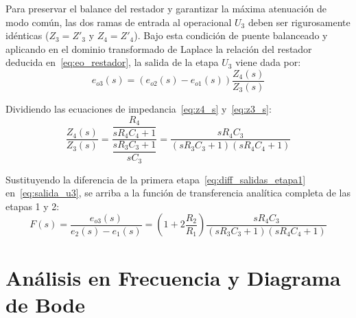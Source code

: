 Para preservar el balance del restador y garantizar la máxima atenuación de modo común, las dos ramas de entrada al
operacional $U_3$ deben ser rigurosamente idénticas ($Z_3 = Z'_3$ y $Z_4 = Z'_4$). Bajo esta condición de puente balanceado
y aplicando en el dominio transformado de Laplace la relación del restador deducida en~\eqref{eq:eo_restador}, la salida de
la etapa $U_3$ viene dada por:
\begin{equation}
  e_{o3}(s) = (e_{o2}(s) - e_{o1}(s)) \frac{Z_4(s)}{Z_3(s)}
  \label{eq:salida_u3}
\end{equation}

Dividiendo las ecuaciones de impedancia~\eqref{eq:z4_s} y~\eqref{eq:z3_s}:
\begin{equation*}
  \frac{Z_4(s)}{Z_3(s)} = \frac{\dfrac{R_4}{s R_4 C_4 + 1}}{\dfrac{s R_3 C_3 + 1}{s C_3}} = \frac{s R_4 C_3}{(s R_3 C_3 + 1)(s R_4 C_4 + 1)}
\end{equation*}

Sustituyendo la diferencia de la primera etapa~\eqref{eq:diff_salidas_etapa1} en~\eqref{eq:salida_u3}, se arriba a la
función de transferencia analítica completa de las etapas 1 y 2:
\begin{equation}
  F(s) = \frac{e_{o3}(s)}{e_2(s) - e_1(s)} = \left(1 + 2 \frac{R_2}{R_1}\right) \frac{s R_4 C_3}{(s R_3 C_3 + 1)(s R_4 C_4 + 1)}
  \label{eq:ft_completa}
\end{equation}

\section{Análisis en Frecuencia y Diagrama de Bode}

